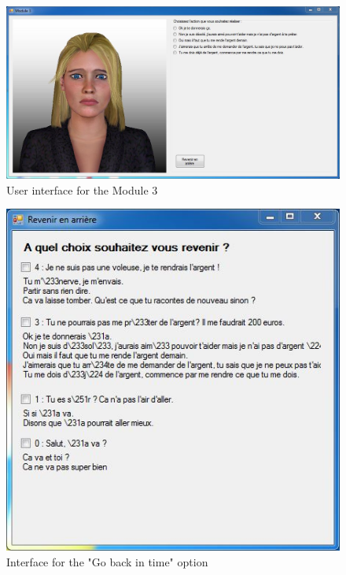 \documentclass[11pt]{article}
\begin{document}
\begin{figure}
   	\centerline{\includegraphics[scale=0.61]{./images/module3_general}}
   	\caption{\label{Figure module 3} User interface for the Module 3}
\end{figure}
\begin{figure}
   	\centerline{\includegraphics[scale=0.75]{./images/module3_backintime}}
   	\caption{\label{Figure backintime} Interface for the "Go back in time" option}
\end{figure}
\clearpage
\end{document}
